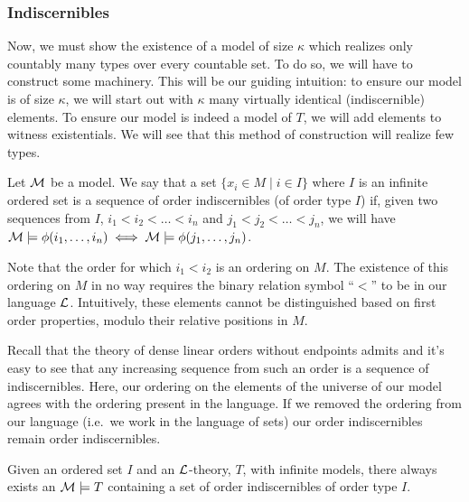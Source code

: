 \subsubsection{Indiscernibles}
Now, we must show the existence of a model of size \(\kappa\) which realizes only countably many types over every countable set. 
To do so, we will have to construct some machinery.
This will be our guiding intuition: to ensure our model is of size \(\kappa\), we will start out with \(\kappa\) many virtually identical (indiscernible) elements. 
To ensure our model is indeed a model of \(T\), we will add elements to witness existentials. 
We will see that this method of construction will realize few types.

\begin{definition}\label{definition_order_indiscernibles}
Let \(\mathcal{M}\) be a model.
We say that a set \(\{x_i \in M \mid i \in I\}\) where \(I\) is an infinite ordered set is a sequence of order indiscernibles (of order type \(I\)) if, given two sequences from \(I\), 
\(i_1 < i_2 < \ldots < i_n\) and \(j_1 < j_2 < \ldots < j_n\), we will have \(\mathcal{M} \models \phi(i_1, \ldots, i_n) \iff \mathcal{M} \models \phi(j_1, \ldots, j_n)\).  
\end{definition}

Note that the order for which \(i_1 < i_2\) is an ordering on \(M\).
The existence of this ordering on \(M\) in no way requires the binary relation symbol ``\(<\)'' to be in our language \(\mathcal{L}\). 
Intuitively, these elements cannot be distinguished based on first order properties, modulo their relative positions in \(M\). 

Recall that the theory of dense linear orders without endpoints admits \qe \cite{mar} and it's easy to see that any increasing sequence from such an order is a sequence of indiscernibles. 
Here, our ordering on the elements of the universe of our model agrees with the ordering present in the language. 
If we removed the ordering from our language (i.e.\ we work in the language of sets) our order indiscernibles remain order indiscernibles. 

\begin{theorem}\label{theorem_order_indiscernibles}
Given an ordered set \(I\) and an \(\mathcal{L}\)-theory, \(T\), with infinite models, there always exists an \(\mathcal{M} \models T\) containing a set of order indiscernibles of order type \(I\). 
\end{theorem}

